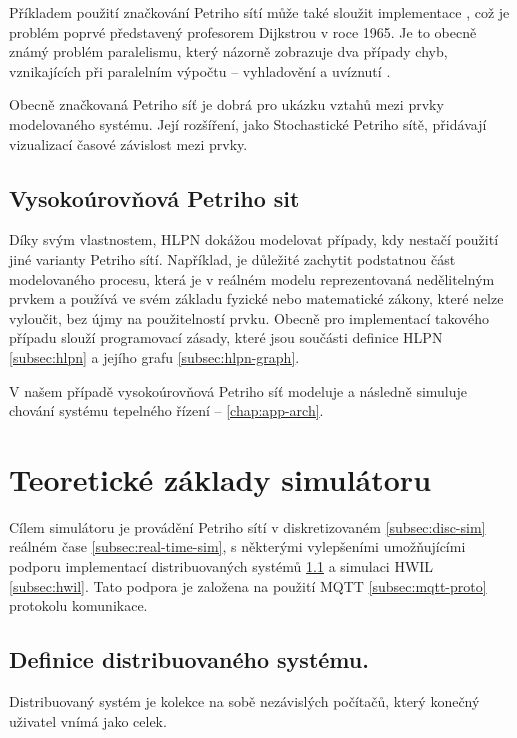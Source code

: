 Příkladem použití značkování Petriho sítí může také sloužit implementace  \cite[p.65--67]{PNandMoS}, což je problém poprvé představený profesorem Dijkstrou v roce 1965.
Je to obecně známý problém paralelismu, který názorně zobrazuje dva případy chyb, vznikajících při paralelním výpočtu -- vyhladovění a uvíznutí \cite{dining_philosophers}.

Obecně značkovaná Petriho síť je dobrá pro ukázku vztahů mezi prvky modelovaného systému. Její rozšíření, jako Stochastické Petriho sítě, přidávají vizualizací časové závislost mezi prvky.

\subsection{Vysokoúrovňová Petriho sit}

Díky svým vlastnostem, HLPN dokážou modelovat případy, kdy nestačí použití jiné varianty Petriho sítí. Například, je důležité zachytit podstatnou část modelovaného procesu, která je v reálném modelu reprezentovaná nedělitelným prvkem a používá ve svém základu fyzické nebo matematické zákony, které nelze vyloučit, bez újmy na použitelností prvku. Obecně pro implementací takového případu slouží programovací zásady, které jsou součásti definice HLPN \ref{subsec:hlpn} a jejího grafu \ref{subsec:hlpn-graph}.

V našem případě vysokoúrovňová Petriho síť modeluje a následně simuluje chování systému tepelného řízení -- \ref{chap:app-arch}.

\section{Teoretické základy simulátoru}
\label{sec:sim-theory}

Cílem simulátoru je provádění Petriho sítí v diskretizovaném \ref{subsec:disc-sim} reálném čase \ref{subsec:real-time-sim}, s některými vylepšeními umožňujícími podporu implementací distribuovaných systémů \ref{subsec:distr_system} a simulaci HWIL \ref{subsec:hwil}. Tato podpora je založena na použití MQTT \ref{subsec:mqtt-proto} protokolu komunikace.

\subsection{Definice distribuovaného systému.}
\label{subsec:distr_system}

Distribuovaný systém je kolekce na sobě nezávislých počítačů, který konečný uživatel vnímá jako celek.

